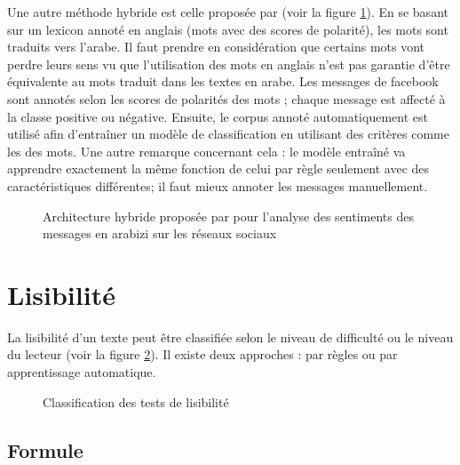 \documentclass{KodeBook}
\begin{document}
Une autre méthode hybride est celle proposée par \citet{18-guellil-al} (voir la figure \ref{fig:asent-guellil}).
En se basant sur un lexicon annoté en anglais (mots avec des scores de polarité), les mots sont traduits vers l'arabe. 
Il faut prendre en considération que certains mots vont perdre leurs sens vu que l'utilisation des mots en anglais n'est pas garantie d'être équivalente au mots traduit dans les textes en arabe. 
Les messages de facebook sont annotés selon les scores de polarités des mots ; chaque message est affecté à la classe positive ou négative.
Ensuite, le corpus annoté automatiquement est utilisé afin d'entraîner un modèle de classification en utilisant des critères comme les  des mots. 
Une autre remarque concernant cela : le modèle entraîné va apprendre exactement la même fonction de celui par règle seulement avec des caractéristiques différentes; il faut mieux annoter les messages manuellement.

\begin{figure}
	\centering
	\caption[Architecture hybride pour l'analyse des sentiments en arabizi]{Architecture hybride proposée par \citet{18-guellil-al} pour l'analyse des sentiments des messages en arabizi sur les réseaux sociaux}
	\label{fig:asent-guellil}
\end{figure}

\section{Lisibilité}

La lisibilité d'un texte peut être classifiée selon le niveau de difficulté ou le niveau du lecteur (voir la figure \ref{fig:lisibilite-classif}). 
Il existe deux approches : par règles ou par apprentissage automatique.

\begin{figure}[!ht]
	\centering
	\caption{Classification des tests de lisibilité}
	\label{fig:lisibilite-classif}
\end{figure}

\subsection{Formule}
\end{document}
